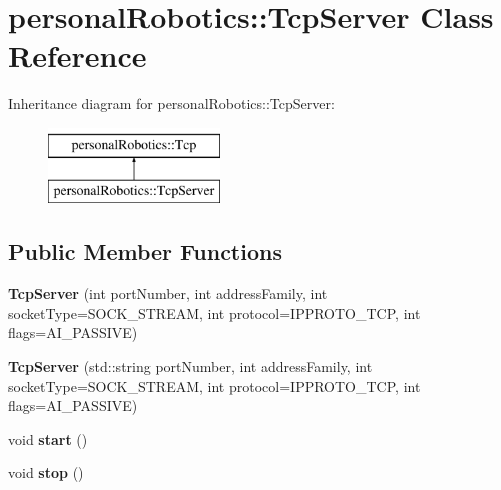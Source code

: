 \hypertarget{classpersonal_robotics_1_1_tcp_server}{}\section{personal\+Robotics\+:\+:Tcp\+Server Class Reference}
\label{classpersonal_robotics_1_1_tcp_server}
Inheritance diagram for personal\+Robotics\+:\+:Tcp\+Server\+:\begin{figure}[H]
\begin{center}
\leavevmode
\includegraphics[height=2.000000cm]{d2/d19/classpersonal_robotics_1_1_tcp_server}
\end{center}
\end{figure}
\subsection*{Public Member Functions}
\begin{DoxyCompactItemize}
\item 
\hypertarget{classpersonal_robotics_1_1_tcp_server_a7fc9c4f57dc8768f33a25518a5c08613}{}{\bfseries Tcp\+Server} (int port\+Number, int address\+Family, int socket\+Type=S\+O\+C\+K\+\_\+\+S\+T\+R\+E\+A\+M, int protocol=I\+P\+P\+R\+O\+T\+O\+\_\+\+T\+C\+P, int flags=A\+I\+\_\+\+P\+A\+S\+S\+I\+V\+E)\label{classpersonal_robotics_1_1_tcp_server_a7fc9c4f57dc8768f33a25518a5c08613}

\item 
\hypertarget{classpersonal_robotics_1_1_tcp_server_afebdf28efacfd43b00f22858656b4399}{}{\bfseries Tcp\+Server} (std\+::string port\+Number, int address\+Family, int socket\+Type=S\+O\+C\+K\+\_\+\+S\+T\+R\+E\+A\+M, int protocol=I\+P\+P\+R\+O\+T\+O\+\_\+\+T\+C\+P, int flags=A\+I\+\_\+\+P\+A\+S\+S\+I\+V\+E)\label{classpersonal_robotics_1_1_tcp_server_afebdf28efacfd43b00f22858656b4399}

\item 
\hypertarget{classpersonal_robotics_1_1_tcp_server_aa539f8839511c3d42b96a9e94c6918a1}{}void {\bfseries start} ()\label{classpersonal_robotics_1_1_tcp_server_aa539f8839511c3d42b96a9e94c6918a1}

\item 
\hypertarget{classpersonal_robotics_1_1_tcp_server_a1bd0a6b4cca0339a6727d576027e0767}{}void {\bfseries stop} ()\label{classpersonal_robotics_1_1_tcp_server_a1bd0a6b4cca0339a6727d576027e0767}

\end{DoxyCompactItemize}

